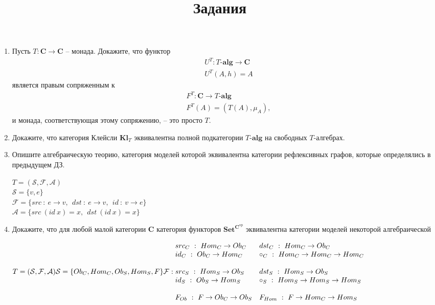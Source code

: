 \documentclass[draft]{article}
\newcommand{\cat}[1]{\mathbf{#1}}
\renewcommand{\C}{\cat{C}}
\newcommand{\Set}{\cat{Set}}
\newcommand{\fs}[1]{\mathrm{#1}}
\begin{document}
\title{Задания}
\maketitle

\begin{enumerate}

\item Пусть $T : \C \to \C$ -- монада.
Докажите, что функтор
\begin{align*}
& U^T : T\text{-}\cat{alg} \to \C \\
& U^T(A,h) = A
\end{align*}
является правым сопряженным к
\begin{align*}
& F^T : \C \to T\text{-}\cat{alg} \\
& F^T(A) = (T(A), \mu_A),
\end{align*}
и монада, соответствующая этому сопряжению, -- это просто $T$.

\item Докажите, что категория Клейсли $\cat{Kl}_T$ эквивалентна полной подкатегории $T\text{-}\cat{alg}$ на свободных $T$-алгебрах.



\item Опишите алгебраическую теорию, категория моделей которой эквивалентна категории рефлексивных графов, которые определялись в предыдущем ДЗ.

$T = (\mathcal{S},\mathcal{F}, \mathcal{A})$\\
$\mathcal{S} = \{v, e\}$\\
$\mathcal{F} = \{src~:~e\to v,~~dst ~:~ e \to v, ~~ id ~:~ v \to e\}$\\
$\mathcal{A} = \{ src ~(id~x) = x,~~ dst ~(id~x) = x\}$

\item Докажите, что для любой малой категории $\C$ категория функторов $\Set^{\C^\fs{op}}$ эквивалентна категории моделей некоторой алгебраической 

$
T = (\mathcal{S},\mathcal{F}, \mathcal{A})\\
\mathcal{S} = \{Ob_C, Hom_C, Ob_S, Hom_S, F\}\\
\mathcal{F}:\\ 
\begin{matrix*}[l]
src_C ~:~ Hom_C \to Ob_C &
dst_C ~:~ Hom_C \to Ob_C\\
id_C ~:~ Ob_C \to Hom_C&
\circ_C ~:~ Hom_C \to Hom_C \to Hom_C\\\\
 src_S ~:~ Hom_S \to Ob_S &
dst_S ~:~ Hom_S \to Ob_S\\ 
id_S ~:~ Ob_S \to Hom_S&
\circ_S ~:~ Hom_S \to Hom_S \to Hom_S\\\\  
F_{Ob}~:~ F \to Ob_C \to Ob_S&
F_{Hom}~:~ F \to Hom_C \to Hom_S\\
\end{matrix*}
$\\


\end{enumerate}
\end{document}
